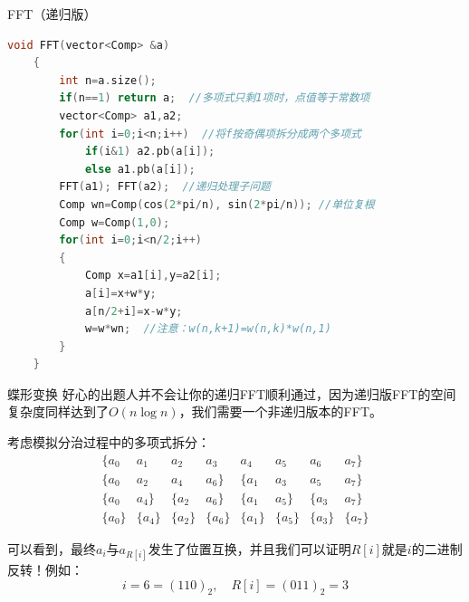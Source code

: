\documentclass{beamer}
\begin{document}
\begin{frame}[fragile]{FFT（递归版）}
    \begin{lstlisting}[language=c++]
    void FFT(vector<Comp> &a)
    {
        int n=a.size();
        if(n==1) return a;  //多项式只剩1项时，点值等于常数项
        vector<Comp> a1,a2;
        for(int i=0;i<n;i++)  //将f按奇偶项拆分成两个多项式
            if(i&1) a2.pb(a[i]);
            else a1.pb(a[i]);
        FFT(a1); FFT(a2);  //递归处理子问题
        Comp wn=Comp(cos(2*pi/n), sin(2*pi/n)); //单位复根
        Comp w=Comp(1,0);
        for(int i=0;i<n/2;i++)
        {
            Comp x=a1[i],y=a2[i];
            a[i]=x+w*y;
            a[n/2+i]=x-w*y;
            w=w*wn;  //注意：w(n,k+1)=w(n,k)*w(n,1)
        }
    }
    \end{lstlisting}
\end{frame}

\begin{frame}{蝶形变换}
    好心的出题人并不会让你的递归FFT顺利通过，因为递归版FFT的空间复杂度同样达到了$O(n\log n)$，我们需要一个非递归版本的FFT。

    考虑模拟分治过程中的多项式拆分：
    \begin{equation*}
        \begin{array}{cccccccc}
            \{a_0 & a_1 & a_2 & a_3 & a_4 & a_5 & a_6 & a_7\} \\
            \{a_0 & a_2 & a_4 & a_6\} & \{a_1 & a_3 & a_5 & a_7\} \\
            \{a_0 & a_4\} & \{a_2 & a_6\} & \{a_1 & a_5\} & \{a_3 & a_7\}\\
            \{a_0\} & \{a_4\} & \{a_2\} & \{a_6\} & \{a_1\} & \{a_5\} & \{a_3\} & \{a_7\}
        \end{array}
    \end{equation*}

    \pause
    可以看到，最终$a_i$与$a_{R[i]}$发生了位置互换，并且我们可以证明$R[i]$就是$i$的二进制反转！例如：
    \begin{equation*}
        i=6=(110)_2,\quad R[i]=(011)_2=3
    \end{equation*}
\end{frame}
\end{document}
